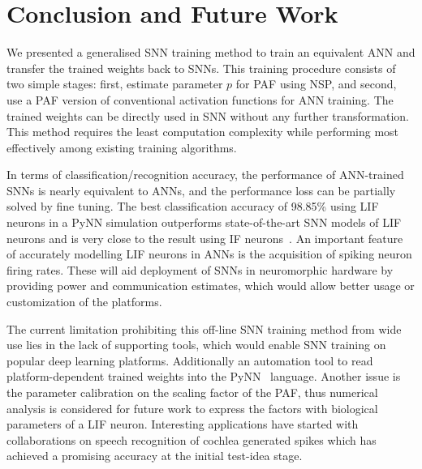 \documentclass{article}
\begin{document}
	\section{Conclusion and Future Work}
	We presented a generalised SNN training method to train an equivalent ANN and transfer the trained weights back to SNNs.
	This training procedure consists of two simple stages: first, estimate parameter $p$ for PAF using NSP, and second, use a PAF version of conventional activation functions for ANN training. %
	The trained weights can be directly used in SNN without any further transformation.
	This method requires the least computation complexity while performing most effectively among existing training algorithms.
	
	In terms of classification/recognition accuracy, the performance of ANN-trained SNNs is nearly equivalent to ANNs, and the performance loss can be partially solved by fine tuning.
	The best classification accuracy of 98.85\% using LIF neurons in a PyNN simulation outperforms state-of-the-art SNN models of LIF neurons and is very close to the result using IF neurons~\cite{diehl2015fast}.
	An important feature of accurately modelling LIF neurons in ANNs is the acquisition of spiking neuron firing rates. These will aid deployment of SNNs in neuromorphic hardware by providing power and communication estimates, which would allow better usage or customization of the platforms.
	
	The current limitation prohibiting this off-line SNN training method from wide use lies in the lack of supporting tools, which would enable SNN training on popular deep learning platforms. Additionally an automation tool to read platform-dependent trained weights into the PyNN~\cite{davison2008pynn} language.
	Another issue is the parameter calibration on the scaling factor of the PAF, thus numerical analysis is considered for future work to express the factors with biological parameters of a LIF neuron.
	Interesting applications have started with collaborations on speech recognition of cochlea generated spikes which has achieved a promising accuracy at the initial test-idea stage.
	
\end{document}
